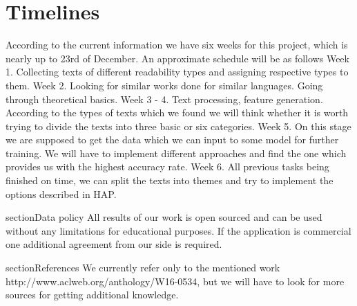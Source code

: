 \documentclass{article}
\begin{document}
\section{Timelines}
According to the current information we have six weeks for this project, which is nearly up to 23rd of December.
An approximate schedule will be as follows\newline
Week 1. Collecting texts of different readability types and assigning respective types to them.\newline
Week 2. Looking for similar works done for similar languages. Going through theoretical basics. \newline
Week 3 - 4. Text processing, feature generation. According to the types of texts which we found we will think whether it is worth trying to divide the texts into three basic or six categories.\newline
Week 5. On this stage we are supposed to get the data which we can input to some model for further training. We will have to implement different approaches and find the one which provides us with the highest accuracy rate.\newline
Week 6. All previous tasks being finished on time, we can split the texts into themes and try to implement the options described in HAP.

section{Data policy}
All results of our work is open sourced and can be used without any limitations for educational purposes. If the application is commercial one additional agreement from our side is required. 

section{References}
We currently refer only to the mentioned work http://www.aclweb.org/anthology/W16-0534, but we will have to look for more sources for getting additional knowledge. 
\end{document}
